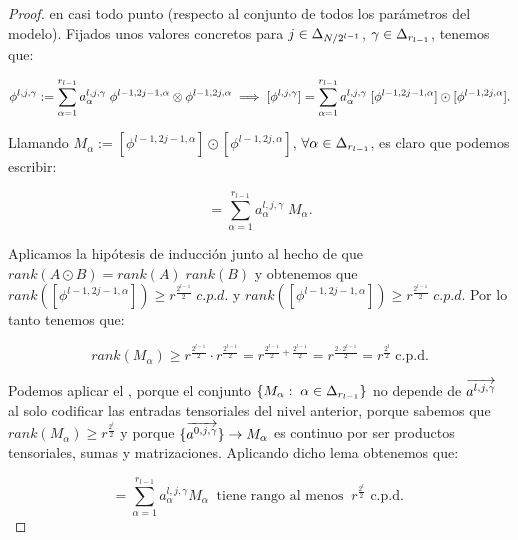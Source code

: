\begin{proof}
    en casi todo punto (respecto al conjunto de todos los parámetros del modelo). Fijados unos valores concretos para $j \in \Delta_{N/2^{l-1}}$, $\gamma \in \Delta_{r_{l-1}}$, tenemos que:

    \begin{equation}
        \phi^{l, j, \gamma} := \sum_{\alpha = 1}^{r_{l-1}} a_{\alpha}^{l, j, \gamma} \; \phi^{l-1, 2j-1, \alpha} \otimes \phi^{l-1, 2j, \alpha} \implies [\phi^{l, j, \gamma}] = \sum_{\alpha = 1}^{r_{l-1}} a_{\alpha}^{l, j, \gamma} \; [\phi^{l-1, 2j-1, \alpha}] \odot [\phi^{l-1, 2j, \alpha}].
    \end{equation}

    Llamando $M_\alpha := [\phi^{l-1, 2j-1, \alpha}] \odot [\phi^{l-1, 2j, \alpha}]$, $\forall \alpha \in \Delta_{r_{l-1}}$, es claro que podemos escribir:

    \begin{equation}
        [\phi^{l, j, \gamma}] = \sum_{\alpha = 1}^{r_{l-1}} a_{\alpha}^{l, j, \gamma} \; M_\alpha.
    \end{equation}

    Aplicamos la hipótesis de inducción junto al hecho de que $rank(A \odot B) = rank(A) \; rank(B)$ y obtenemos que $rank([\phi^{l-1, 2j-1, \alpha}]) \geq r^{\frac{2^{l-1}}{2}} \; c.p.d.$ y $rank([\phi^{l-1, 2j-1, \alpha}]) \geq r^{\frac{2^{l-1}}{2}} \; c.p.d.$ Por lo tanto tenemos que:

    \begin{equation}
        rank(M_\alpha) \geq r^{\frac{2^{l-1}}{2}} \cdot r^{\frac{2^{l-1}}{2}} = r^{\frac{2^{l-1}}{2} + \frac{2^{l-1}}{2}} =
        r^{\frac{2 \cdot 2^{l - 1}}{2}} = r^{\frac{2^{l}}{2}} \; \text{c.p.d.}
    \end{equation}

    Podemos aplicar el , porque el conjunto $\{ M_\alpha: \; \alpha \in \Delta_{r_{l-1}} \}$ no depende de $\overrightarrow{a^{l, j, \gamma}}$ al solo codificar las entradas tensoriales del nivel anterior, porque sabemos que $rank(M_\alpha) \geq r^{\frac{2^l}{2}}$ y porque $\{ \overrightarrow{a^{0, j, \gamma}} \} \to M_\alpha$ es continuo por ser productos tensoriales, sumas y matrizaciones. Aplicando dicho lema obtenemos que:

    \begin{equation}
        [\phi^{l, j, \gamma}] = \sum_{\alpha = 1}^{r_{l-1}} a_\alpha^{l,j,\gamma} M_\alpha \;\; \text{tiene rango al menos} \; \; r^{\frac{2^l}{2}} \text{ c.p.d. }
    \end{equation}


\end{proof}
